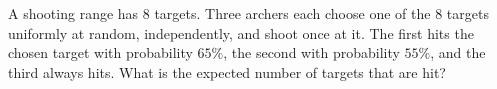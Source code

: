 A shooting range has $8$ targets. Three archers each choose one of the $8$ targets uniformly at random, independently, and shoot once at it. The first hits the chosen target with probability $65\%$, the second with probability $55\%$, and the third always hits. What is the expected number of targets that are hit?
